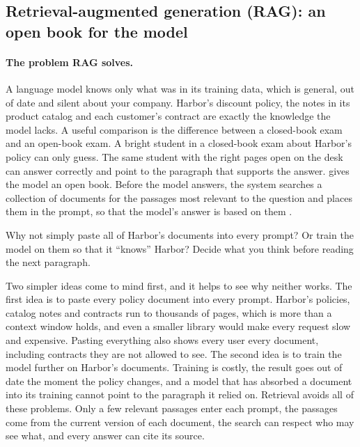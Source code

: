 \subsection{Retrieval-augmented generation (RAG): an open book for the model}
\label{sec:block-rag}

\paragraph{The problem RAG solves.} A language model knows only what was in its training data, which is general, out of date and silent about your company. Harbor's discount policy, the notes in its product catalog and each customer's contract are exactly the knowledge the model lacks. A useful comparison is the difference between a closed-book exam and an open-book exam. A bright student in a closed-book exam about Harbor's policy can only guess. The same student with the right pages open on the desk can answer correctly and point to the paragraph that supports the answer.  gives the model an open book. Before the model answers, the system searches a collection of documents for the passages most relevant to the question and places them in the prompt, so that the model's answer is based on them \citep{lewis2020rag}.

\begin{thinkabout}
Why not simply paste all of Harbor's documents into every prompt? Or train the model on them so that it ``knows'' Harbor? Decide what you think before reading the next paragraph.
\end{thinkabout}

Two simpler ideas come to mind first, and it helps to see why neither works. The first idea is to paste every policy document into every prompt. Harbor's policies, catalog notes and contracts run to thousands of pages, which is more than a context window holds, and even a smaller library would make every request slow and expensive. Pasting everything also shows every user every document, including contracts they are not allowed to see. The second idea is to train the model further on Harbor's documents. Training is costly, the result goes out of date the moment the policy changes, and a model that has absorbed a document into its training cannot point to the paragraph it relied on. Retrieval avoids all of these problems. Only a few relevant passages enter each prompt, the passages come from the current version of each document, the search can respect who may see what, and every answer can cite its source.

